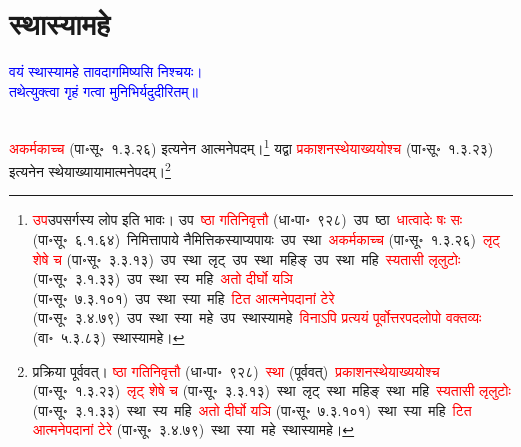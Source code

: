 \section[स्थास्यामहे]{स्थास्यामहे}
\centering\textcolor{blue}{वयं स्थास्यामहे तावदागमिष्यसि निश्चयः।\nopagebreak\\
तथेत्युक्त्वा गृहं गत्वा मुनिभिर्यदुदीरितम्॥}\nopagebreak\\
\\
\fontsize{14}{21}\selectfont\begin{sloppypar}\justifying\noindent\hspace{10mm} \textcolor{red}{अकर्मकाच्च} (पा॰सू॰~१.३.२६) इत्यनेन आत्मनेपदम्।\footnote{\textcolor{red}{उप}\-उपसर्गस्य लोप इति भावः। उप~\textcolor{red}{ष्ठा गतिनिवृत्तौ} (धा॰पा॰~९२८)~\arrow उप~ष्ठा~\arrow \textcolor{red}{धात्वादेः षः सः} (पा॰सू॰~६.१.६४)~\arrow निमित्तापाये नैमित्तिकस्याप्यपायः~\arrow उप~स्था~\arrow \textcolor{red}{अकर्मकाच्च} (पा॰सू॰~१.३.२६)~\arrow \textcolor{red}{लृट् शेषे च} (पा॰सू॰~३.३.१३)~\arrow उप~स्था~लृट्~\arrow उप~स्था~महिङ्~\arrow उप~स्था~महि~\arrow \textcolor{red}{स्यतासी लृलुटोः} (पा॰सू॰~३.१.३३)~\arrow उप~स्था~स्य~महि~\arrow \textcolor{red}{अतो दीर्घो यञि} (पा॰सू॰~७.३.१०१)~\arrow उप~स्था~स्या~महि~\arrow \textcolor{red}{टित आत्मनेपदानां टेरे} (पा॰सू॰~३.४.७९)~\arrow उप~स्था~स्या~महे~\arrow उप~स्थास्यामहे~\arrow \textcolor{red}{विनाऽपि प्रत्ययं पूर्वोत्तर\-पद\-लोपो वक्तव्यः} (वा॰~५.३.८३)~\arrow स्थास्यामहे।} यद्वा \textcolor{red}{प्रकाशन\-स्थेयाख्ययोश्च} (पा॰सू॰~१.३.२३) इत्यनेन स्थेयाख्यायामात्मने\-पदम्।\footnote{प्रक्रिया पूर्ववत्। \textcolor{red}{ष्ठा गतिनिवृत्तौ} (धा॰पा॰~९२८)~\arrow \textcolor{red}{स्था} (पूर्ववत्)~\arrow \textcolor{red}{प्रकाशन\-स्थेयाख्ययोश्च} (पा॰सू॰~१.३.२३)~\arrow \textcolor{red}{लृट् शेषे च} (पा॰सू॰~३.३.१३)~\arrow स्था~लृट्~\arrow स्था~महिङ्~\arrow स्था~महि~\arrow \textcolor{red}{स्यतासी लृलुटोः} (पा॰सू॰~३.१.३३)~\arrow स्था~स्य~महि~\arrow \textcolor{red}{अतो दीर्घो यञि} (पा॰सू॰~७.३.१०१)~\arrow स्था~स्या~महि~\arrow \textcolor{red}{टित आत्मनेपदानां टेरे} (पा॰सू॰~३.४.७९)~\arrow स्था~स्या~महे~\arrow स्थास्यामहे।}\end{sloppypar}
